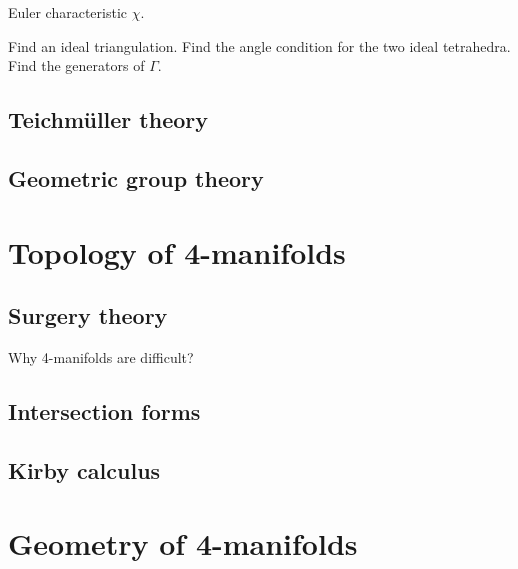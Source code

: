 \documentclass{../../large}
\begin{document}
\begin{prb}
Euler characteristic $\chi$.
\end{prb}
\begin{prb}
Find an ideal triangulation.
Find the angle condition for the two ideal tetrahedra.
Find the generators of $\Gamma$.
\end{prb}
\begin{prb}
\end{prb}
\begin{prb}
\end{prb}


\chapter{Teichm\"uller theory}
\section{}

\chapter{Geometric group theory}
\section{}


\part{Topology of 4-manifolds}
\chapter{Surgery theory}
Why 4-manifolds are difficult?
\chapter{Intersection forms}
\chapter{Kirby calculus}


\part{Geometry of 4-manifolds}
\chapter{}
\chapter{}
\chapter{}
\end{document}
